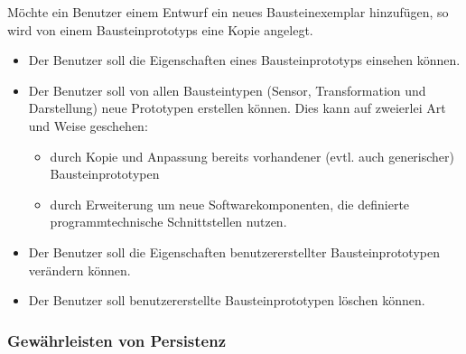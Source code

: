 \documentclass[parskip=full]{scrartcl}
\begin{document}
Möchte ein Benutzer einem Entwurf ein neues Bausteinexemplar hinzufügen, so wird von einem \glspl{Bausteinprototyp} eine Kopie angelegt.

\begin{itemize}
	
	\item 
	\begin{SollKrit} 
		Der Benutzer soll die Eigenschaften eines Bausteinprototyps einsehen können.
	\end{SollKrit}
	
	\item Der Benutzer soll von allen Bausteintypen (Sensor, Transformation und Darstellung) neue Prototypen erstellen können. Dies kann auf zweierlei Art und Weise geschehen: 
	
	\begin{itemize}
		
		\item 
		\begin{SollKrit} 
			durch Kopie und Anpassung bereits vorhandener (evtl. auch generischer) Bausteinprototypen
		\end{SollKrit}
		
		\item 
		\begin{WunschKrit} 
			durch Erweiterung um neue Softwarekomponenten, die definierte programmtechnische Schnittstellen nutzen.
		\end{WunschKrit}
		
	\end{itemize}
	
	\item 
	\begin{SollKrit}
		Der Benutzer soll die Eigenschaften benutzererstellter Bausteinprototypen verändern können.
	\end{SollKrit}
	
	\item 
	\begin{SollKrit}
		Der Benutzer soll benutzererstellte Bausteinprototypen löschen können.
	\end{SollKrit}
	
	
\end{itemize}

\subsubsection{Gewährleisten von Persistenz}
\end{document}
